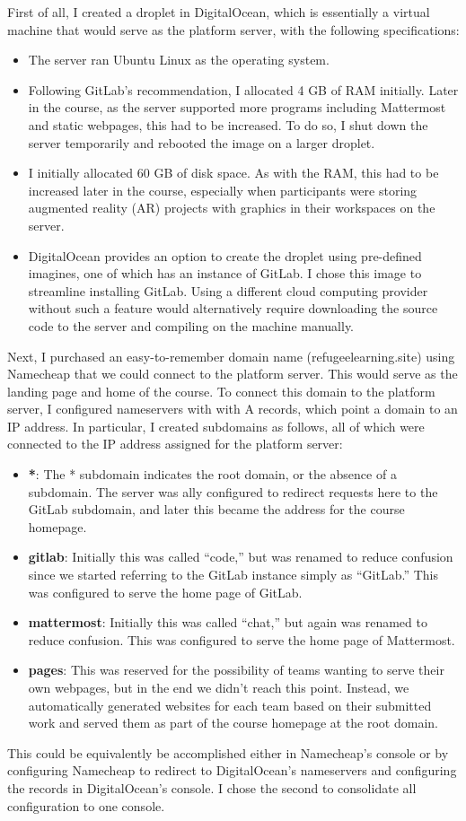\documentclass[12pt,twoside]{mitthesis}
\newcommand{\draft}[1]{{\color{blue} #1}}
\begin{document}
\draft{First of all, I created a droplet in DigitalOcean, which is essentially a virtual machine that would serve as the platform server, with the following specifications:
\begin{itemize}
	\item The server ran Ubuntu Linux as the operating system.
	\item Following GitLab's recommendation, I allocated 4 GB of RAM initially. Later in the course, as the server supported more programs including Mattermost and static webpages, this had to be increased. To do so, I shut down the server temporarily and rebooted the image on a larger droplet.
	\item I initially allocated 60 GB of disk space. As with the RAM, this had to be increased later in the course, especially when participants were storing augmented reality (AR) projects with graphics in their workspaces on the server.
	\item DigitalOcean provides an option to create the droplet using pre-defined imagines, one of which has an instance of GitLab. I chose this image to streamline installing GitLab. Using a different cloud computing provider without such a feature would alternatively require downloading the source code to the server and compiling on the machine manually.
\end{itemize}

Next, I purchased an easy-to-remember domain name (refugeelearning.site) using Namecheap that we could connect to the platform server. This would serve as the landing page and home of the course. To connect this domain to the platform server, I configured nameservers with with A records, which point a domain to an IP address. In particular, I created subdomains as follows, all of which were connected to the IP address assigned for the platform server:
\begin{itemize}
\item \textbf{*}: The * subdomain indicates the root domain, or the absence of a subdomain. The server was ally configured to redirect requests here to the GitLab subdomain, and later this became the address for the course homepage.
\item \textbf{gitlab}: Initially this was called ``code,'' but was renamed to reduce confusion since we started referring to the GitLab instance simply as ``GitLab.'' This was configured to serve the home page of GitLab.
\item \textbf{mattermost}: Initially this was called ``chat,'' but again was renamed to reduce confusion. This was configured to serve the home page of Mattermost.
\item \textbf{pages}: This was reserved for the possibility of teams wanting to serve their own webpages, but in the end we didn't reach this point. Instead, we automatically generated websites for each team based on their submitted work and served them as part of the course homepage at the root domain.
\end{itemize}
This could be equivalently be accomplished either in Namecheap's console or by configuring Namecheap to redirect to DigitalOcean's nameservers and configuring the records in DigitalOcean's console. I chose the second to consolidate all configuration to one console.

}
\end{document}
